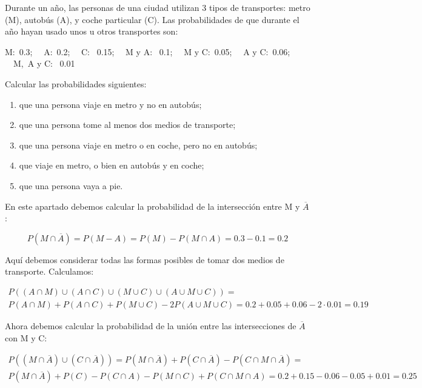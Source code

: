\problem

Durante un a{\~n}o,  las  personas  de  una  ciudad  utilizan  3  tipos  de
transportes: metro (M),  autob{\'u}s  (A),  y  coche  particular  (C).  Las
probabilidades  de  que  durante  el  a{\~n}o  hayan  usado  unos  u  otros
transportes son:

M:\ 0.3; \ \ A:\ 0.2; \ \ C: \ 0.15; \ \ M y A: \ 0.1; \ \ M y C:\ 0.05; \ \ A y C:\ 0.06; \ \ M,\ A y C: \ 0.01

Calcular las probabilidades siguientes:
\begin{enumerate}
	\item que una persona viaje en metro y no en autob{\'u}s;
	\item que una persona tome al menos dos medios de transporte;
	\item que una persona viaje en metro o en coche, pero no en autob{\'u}s;
	\item que viaje en metro,  o bien en autob{\'u}s y en coche;
	\item que una persona vaya a pie.
\end{enumerate}

\subproblem
En este apartado debemos calcular la probabilidad de la intersección entre M y $\overline{A}$:

\begin{equation*}
    P(M \cap \overline{A}) = P(M-A) = P(M) - P(M \cap A) = 0.3 - 0.1 = 0.2
\end{equation*}

\subproblem
Aquí debemos considerar todas las formas posibles de tomar dos medios de transporte. Calculamos:

\begin{gather*}
    P((A \cap M) \cup (A \cap C) \cup (M \cup C) \cup (A \cup M \cup C)) =\\ P(A \cap M) + P(A \cap C) + P(M \cup C) - 2P(A \cup M \cup C) = 0.2 + 0.05 + 0.06 - 2 \cdot 0.01 = 0.19
\end{gather*}

\subproblem
Ahora debemos calcular la probabilidad de la unión entre las intersecciones de $\overline{A}$ con M y C:

\begin{gather*}
    P((M \cap \overline{A}) \cup (C \cap \overline{A})) = P(M \cap \overline{A}) + P(C \cap \overline{A}) - P(C \cap M \cap \overline{A}) = \\P(M \cap \overline{A}) + P(C) - P(C \cap A) - P(M \cap C) + P(C \cap M \cap A) = 0.2 + 0.15 - 0.06 - 0.05 + 0.01 = 0.25
\end{gather*}

